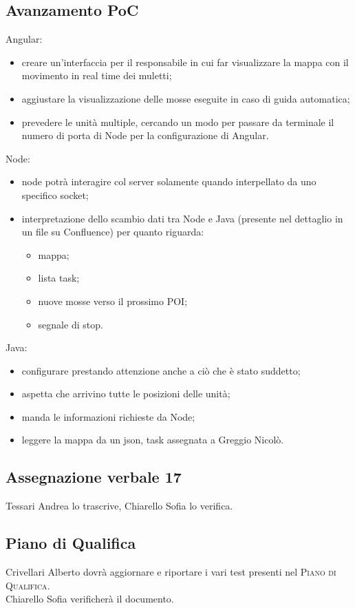 \subsection{Avanzamento PoC}
Angular:
\begin{itemize}
	\item creare un'interfaccia per il responsabile in cui far visualizzare la mappa con il movimento in real time dei muletti;
	\item aggiustare la visualizzazione delle mosse eseguite in caso di guida automatica;
	\item prevedere le unità multiple, cercando un modo per passare da terminale il numero di porta di Node per la configurazione di Angular.
\end{itemize}
Node:
\begin{itemize}
	\item node potrà interagire col server solamente quando interpellato da uno specifico socket;
	\item interpretazione dello scambio dati tra Node e Java (presente nel dettaglio in un file su Confluence) per quanto riguarda:
	\begin{itemize}
		\item mappa;
		\item lista task;
		\item nuove mosse verso il prossimo POI;
		\item segnale di stop.
	\end{itemize}
\end{itemize}
Java:
\begin{itemize}
	\item configurare prestando attenzione anche a ciò che è stato suddetto;
	\item aspetta che arrivino tutte le posizioni delle unità;
	\item manda le informazioni richieste da Node;
	\item leggere la mappa da un json, task assegnata a Greggio Nicolò.
\end{itemize}

\subsection{Assegnazione verbale 17}
Tessari Andrea lo trascrive, Chiarello Sofia lo verifica.

\subsection{Piano di Qualifica}
Crivellari Alberto dovrà aggiornare e riportare i vari test presenti nel \textsc{Piano di Qualifica}.\\
Chiarello Sofia verificherà il documento.

